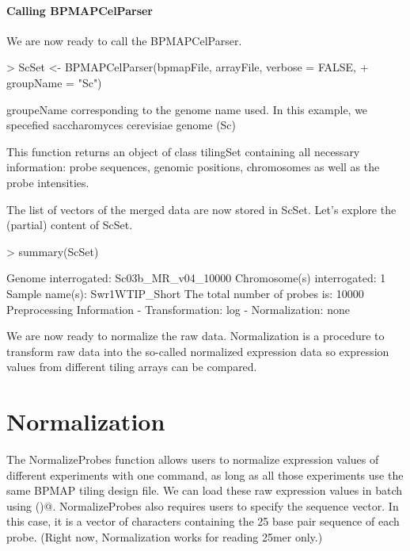\documentclass[11pt]{article}
\begin{document}
\subsection*{Calling BPMAPCelParser}
We are now ready to call the BPMAPCelParser. 
\\
 
\begin{Schunk}
\begin{Sinput}
> ScSet <- BPMAPCelParser(bpmapFile, arrayFile, verbose = FALSE, 
+     groupName = "Sc")
\end{Sinput}
\end{Schunk}

groupeName corresponding to the genome name used. In this example, we specefied saccharomyces cerevisiae genome (Sc)


This function returns an object of class tilingSet containing all necessary information: probe sequences, genomic positions, chromosomes as well as the probe intensities. 

The list of vectors of the merged data are now stored in ScSet.
Let's explore the (partial) content of ScSet.

\begin{Schunk}
\begin{Sinput}
> summary(ScSet)
\end{Sinput}
\begin{Soutput}
   Genome interrogated:  Sc03b_MR_v04_10000  
   Chromosome(s) interrogated: 1 
   Sample name(s):  Swr1WTIP_Short  
   The total number of probes is:  10000  
   Preprocessing Information 
     - Transformation: log 
     - Normalization: none 
\end{Soutput}
\end{Schunk}

We are now ready to normalize the raw data. Normalization is a procedure to transform raw data into the so-called normalized expression data so expression values from different tiling arrays can be compared. 

\part{Normalization}
The NormalizeProbes function allows users to normalize expression values of different experiments with one command, as long as all those experiments use the same BPMAP tiling design file. We can load these raw expression values in batch using \verb@cbind()@. NormalizeProbes also requires users to specify the sequence vector. In this case, it is a vector of characters containing the 25 base pair sequence of each probe.  (Right now, Normalization works for reading 25mer only.)
\end{document}
